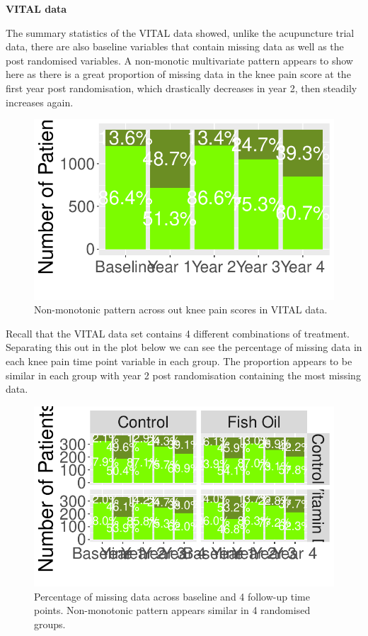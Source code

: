\documentclass{article}
\newcommand{\pandocbounded}[1]{#1}
\begin{document}
\textbf{VITAL data}

The summary statistics of the VITAL data showed, unlike the acupuncture
trial data, there are also baseline variables that contain missing data
as well as the post randomised variables. A non-monotic multivariate
pattern appears to show here as there is a great proportion of missing
data in the knee pain score at the first year post randomisation, which
drastically decreases in year 2, then steadily increases again.

\begin{figure}
\centering
\pandocbounded{\includegraphics[keepaspectratio]{Final_Report_files/figure-latex/unnamed-chunk-27-1.pdf}}
\caption{Non-monotonic pattern across out knee pain scores in VITAL
data.}
\end{figure}

Recall that the VITAL data set contains 4 different combinations of
treatment. Separating this out in the plot below we can see the
percentage of missing data in each knee pain time point variable in each
group. The proportion appears to be similar in each group with year 2
post randomisation containing the most missing data.

\begin{figure}
\centering
\pandocbounded{\includegraphics[keepaspectratio]{Final_Report_files/figure-latex/unnamed-chunk-28-1.pdf}}
\caption{Percentage of missing data across baseline and 4 follow-up time
points. Non-monotonic pattern appears similar in 4 randomised groups.}
\end{figure}
\end{document}
